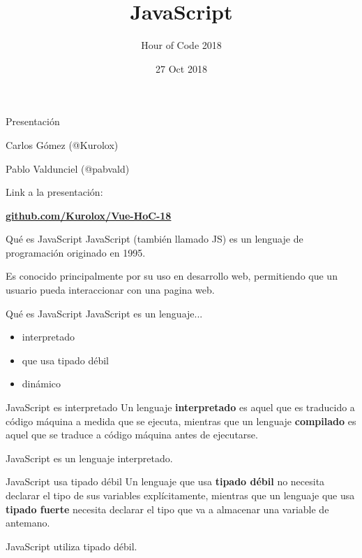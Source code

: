 \documentclass{beamer}
\title{JavaScript}
\subtitle{Hour of Code 2018}
\institute{Universidad de Valladolid}
\date{27 Oct 2018}
\begin{document}
\begin{frame}
        \maketitle
\end{frame}
    \setlength{\parskip}{\baselineskip}%
    \setlength{\parindent}{0pt}%

\begin{frame}{Presentación}
\centering
{\Large Carlos Gómez (@Kurolox)

Pablo Valdunciel (@pabvald)\bigskip\pause

 Link a la presentación:}

\centering\textbf{\hyperlink{https://github.com/Kurolox/Vue-HoC-18}{\Large github.com/Kurolox/Vue-HoC-18}}
\end{frame}
\begin{frame}{Qué es JavaScript}
    	\pause
        JavaScript (también llamado JS) es un lenguaje de programación originado en 1995.\pause

    	Es conocido principalmente por su uso en desarrollo web, permitiendo que un usuario pueda interaccionar con una pagina web.
\end{frame}
\begin{frame}{Qué es JavaScript}
        JavaScript es un lenguaje... \bigskip
        \begin{itemize}
            \item interpretado\pause
            \item que usa tipado débil\pause
            \item dinámico
    \end{itemize}
\end{frame}
    
\begin{frame}{JavaScript es interpretado}
        \pause
        Un lenguaje \textbf{interpretado} es aquel que es traducido a código máquina a medida que se ejecuta, mientras que un lenguaje \textbf{compilado} es aquel que se traduce a código máquina antes de ejecutarse.\pause
        \centering
        
        JavaScript es un lenguaje interpretado.
\end{frame}
    
\begin{frame}{JavaScript usa tipado débil}
        \pause
        Un lenguaje que usa \textbf{tipado débil} no necesita declarar el tipo de sus variables explícitamente, mientras que un lenguaje que usa \textbf{tipado fuerte} necesita declarar el tipo que va a almacenar una variable de antemano.\pause
        \centering
        
        JavaScript utiliza tipado débil.
\end{frame}
    
\end{document}
